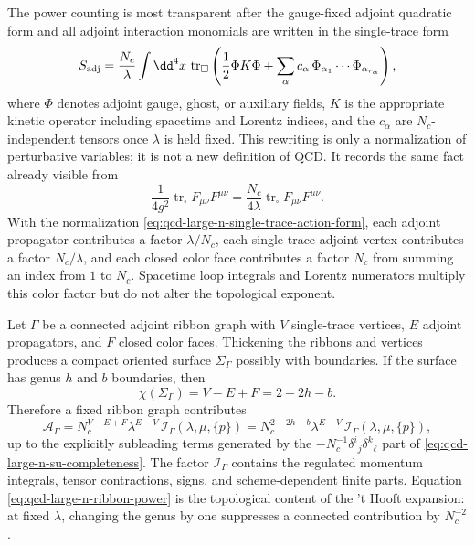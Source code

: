 The power counting is most transparent after the gauge-fixed adjoint
quadratic form and all adjoint interaction monomials are written in the
single-trace form
\begin{equation}
  S_{\rm adj}
  =
  \frac{N_c}{\lambda}
  \int\dd^4x\,
  \operatorname{tr}_{\square}
  \left(
    \frac12\Phi K\Phi+\sum_{\alpha} c_\alpha\,\Phi_{\alpha_1}\cdots
    \Phi_{\alpha_{r_\alpha}}
  \right),
  \label{eq:qcd-large-n-single-trace-action-form}
\end{equation}
where \(\Phi\) denotes adjoint gauge, ghost, or auxiliary fields, \(K\) is the
appropriate kinetic operator including spacetime and Lorentz indices, and the
\(c_\alpha\) are \(N_c\)-independent tensors once \(\lambda\) is held fixed.
This rewriting is only a normalization of perturbative variables; it is not a
new definition of QCD.  It records the same fact already visible from
\[
  \frac1{4g^2}\operatorname{tr}_{\square}F_{\mu\nu}F^{\mu\nu}
  =
  \frac{N_c}{4\lambda}\operatorname{tr}_{\square}F_{\mu\nu}F^{\mu\nu}.
\]
With the normalization \eqref{eq:qcd-large-n-single-trace-action-form}, each
adjoint propagator contributes a factor \(\lambda/N_c\), each single-trace
adjoint vertex contributes a factor \(N_c/\lambda\), and each closed color
face contributes a factor \(N_c\) from summing an index from \(1\) to \(N_c\).
Spacetime loop integrals and Lorentz numerators multiply this color factor but
do not alter the topological exponent.

Let \(\Gamma\) be a connected adjoint ribbon graph with \(V\) single-trace
vertices, \(E\) adjoint propagators, and \(F\) closed color faces.  Thickening
the ribbons and vertices produces a compact oriented surface \(\Sigma_\Gamma\)
possibly with boundaries.  If the surface has genus \(h\) and \(b\) boundaries,
then
\begin{equation}
  \chi(\Sigma_\Gamma)
  =
  V-E+F
  =
  2-2h-b .
  \label{eq:qcd-large-n-euler-characteristic}
\end{equation}
Therefore a fixed ribbon graph contributes
\begin{equation}
  \mathcal A_\Gamma
  =
  N_c^{V-E+F}\lambda^{E-V}\,
  \mathcal I_\Gamma(\lambda,\mu,\{p\})
  =
  N_c^{2-2h-b}\lambda^{E-V}\,
  \mathcal I_\Gamma(\lambda,\mu,\{p\}),
  \label{eq:qcd-large-n-ribbon-power}
\end{equation}
up to the explicitly subleading terms generated by the
\(-N_c^{-1}\delta^i{}_j\delta^k{}_{\ell}\) part of
\eqref{eq:qcd-large-n-su-completeness}.  The factor
\(\mathcal I_\Gamma\) contains the regulated momentum integrals, tensor
contractions, signs, and scheme-dependent finite parts.  Equation
\eqref{eq:qcd-large-n-ribbon-power} is the topological content of the
't Hooft expansion: at fixed \(\lambda\), changing the genus by one suppresses
a connected contribution by \(N_c^{-2}\).

